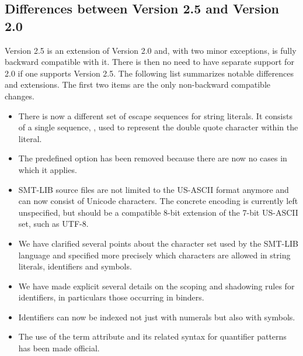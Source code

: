\subsection{Differences between Version 2.5 and Version 2.0}

Version 2.5 is an extension of Version 2.0 and, with two minor exceptions,
is fully backward compatible with it.
There is then no need to have separate support for 2.0 
if one supports Version 2.5.
The following list summarizes notable differences and extensions.
The first two items are the only non-backward compatible changes.


\begin{itemize}
\item
There is now a different set of escape sequences for string literals.
It consists of a single sequence, , used to represent the double quote
character within the literal.

\item
The predefined option  has been removed
because there are now no cases in which it applies. 

\item
SMT-LIB source files are not limited to the US-ASCII format anymore
and can now consist of Unicode characters.  
The concrete encoding is currently left unspecified, but should be 
a compatible 8-bit extension of the 7-bit US-ASCII set, such as UTF-8.

\item
We have clarified several points about the character set used 
by the SMT-LIB language and specified more precisely which characters are allowed
in string literals, identifiers and symbols.

\item
We have made explicit several details on the scoping and shadowing rules
for identifiers, in particulars those occurring in binders.

\item
Identifiers can now be indexed not just with numerals but also with symbols.

\item
The use of the term attribute  and its related syntax 
for quantifier patterns has been made official.

 

\end{itemize}
